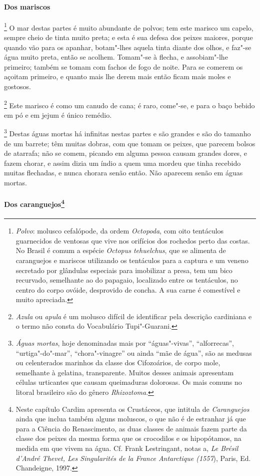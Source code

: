 \paragraph{Dos mariscos}

\footnote{ \textit{Polvo}: molusco
cefalópode, da ordem \textit{Octopoda}, com oito tentáculos guarnecidos
de ventosas que vive nos orifícios dos rochedos perto das costas. No
Brasil é comum a espécie \textit{Octopus tehuelchus}, que se alimenta
de caranguejos e mariscos utilizando os tentáculos para a captura e um
veneno secretado por glândulas especiais para imobilizar a presa, tem
um bico recurvado, semelhante ao do papagaio, localizado entre os
tentáculos, no centro do corpo ovóide, desprovido de concha. A sua
carne é comestível e muito apreciada.} O mar destas partes
é muito abundante de polvos; tem este marisco um capelo, sempre cheio
de tinta muito preta; e esta é sua defesa dos peixes maiores, porque
quando vão para os apanhar, botam"-lhes aquela tinta diante dos olhos, e
faz"-se água muito preta, então se acolhem. Tomam"-se à flecha, e
assobiam"-lhe primeiro; também se tomam com fachos de fogo de noite.
Para se comerem os açoitam primeiro, e quanto mais lhe derem mais então
ficam mais moles e gostosos.

\footnote{ \textit{Azula} ou \textit{apula} é um
molusco difícil de identificar pela descrição cardiniana e o termo não
consta do Vocabulário Tupi"-Guarani.} Este marisco é como um canudo de cana; 
é raro, come"-se, e para o baço bebido em pó e em jejum é único remédio.

\footnote{ \textit{Águas mortas}, hoje
denominadas mais por ``águas"-vivas'', ``alforrecas'', ``urtiga"-do"-mar'',
``chora"-vinagre'' ou ainda ``mãe de água'', são as medusas ou celenterados
marinhos da classe dos Cifozoários, de corpo mole, semelhante à
gelatina, transparente. Muitos desses animais apresentam células
urticantes que causam queimaduras dolorosas. Os mais comuns no litoral
brasileiro são do gênero \textit{Rhizoztoma}.} Destas águas mortas há 
infinitas nestas partes e são grandes e são do tamanho
de um barrete; têm muitas dobras, com que tomam os peixes, que parecem
bolsos de atarrafa; não se comem, picando em alguma pessoa causam
grandes dores, e fazem chorar, e assim dizia um índio a quem uma mordeu
que tinha recebido muitas flechadas, e nunca chorara senão então. Não
aparecem senão em águas mortas. 


\paragraph[Dos caranguejos]{Dos caranguejos\protect\footnote{ Neste capítulo Cardim apresenta
os Crustáceos, que intitula de \textit{Caranguejos} ainda que inclua
também alguns moluscos, o que não é de estranhar já que para a Ciência
do Renascimento, as duas classes de animais fazem parte da classe dos
peixes da mesma forma que os crocodilos e os hipopótamos, na medida em
que vivem na água. Cf. Frank Lestringant, notas a, \textit{Le Brésil
d'André Thevet, Les Singularités de la France Antarctique (1557}), Paris, Ed. Chandeigne, 1997.}}

